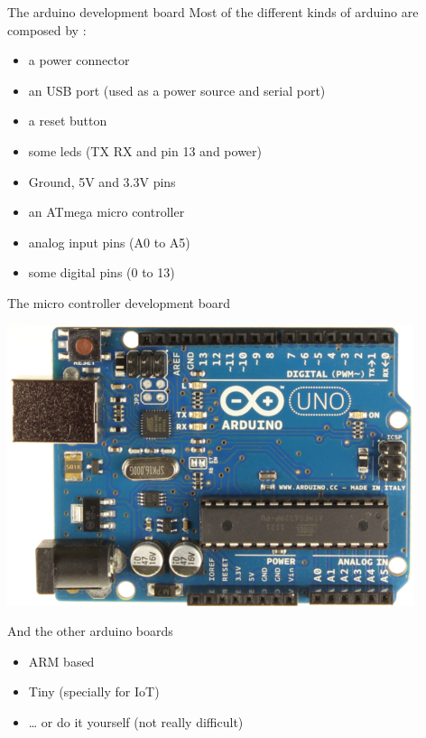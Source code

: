 \begin{frame}{The arduino development board}
	Most of the different kinds of arduino are composed by :
	\begin{itemize}
		\item a power connector
		\pause
		\item an USB port (used as a power source and serial port)
		\pause
		\item a reset button
		\pause
		\item some leds (TX RX and pin 13 and power)
		\pause
		\item Ground, 5V and 3.3V pins
		\pause
		\item an ATmega micro controller
		\pause
		\item analog input pins (A0 to A5)
		\pause
		\item some digital pins (0 to 13)
	\end{itemize}
\end{frame}

\begin{frame}{The micro controller development board}
    \begin{center}
    \includegraphics [width=.9\textwidth,keepaspectratio] {img/arduino}
    \end{center}
\end{frame}

\begin{frame}{And the other arduino boards}
	\begin{itemize}
		\item ARM based
		\item Tiny (specially for IoT)
		\item … or do it yourself (not really difficult)
	\end{itemize}
\end{frame}

